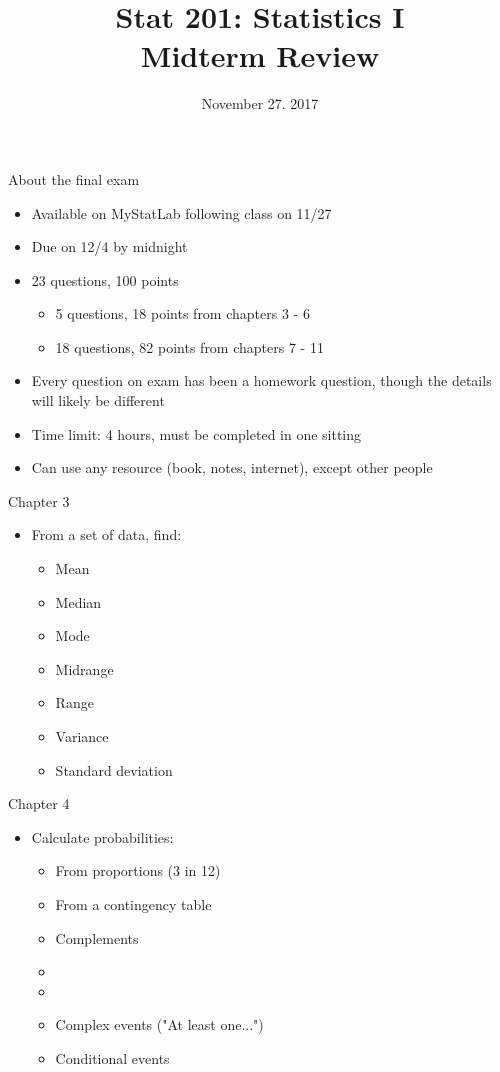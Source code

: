 \documentclass[xcolor=table]{beamer}
\title[Midterm Review]{Stat 201: Statistics I\\Midterm Review}
\author[M. Shyne]{}
\institute[Metro State]{\texttt{[image: ../images/metro\_logo]}}
\date[Nov 27. 2017]{November 27. 2017}
\begin{document}
\frame{\titlepage}

\begin{frame}{About the final exam}
\begin{block}{}
\large
\begin{itemize}
\item Available on MyStatLab following class on 11/27
\item Due on 12/4 by midnight
\item 23 questions, 100 points
\begin{itemize}
\item 5 questions, 18 points from chapters 3 - 6
\item 18 questions, 82 points from chapters 7 - 11
\end{itemize}
\item Every question on exam has been a homework question, though the details will likely be different
\item Time limit: 4 hours, must be completed in one sitting
\item Can use any resource (book, notes, internet), except other people
\end{itemize}
\end{block}
\end{frame}


\begin{frame}{Chapter 3}
\begin{block}{}
\large
\begin{itemize}
\item From a set of data, find:
\begin{itemize}
\item Mean
\item Median
\item Mode
\item Midrange
\item Range
\item Variance
\item Standard deviation
\end{itemize}
\end{itemize}
\end{block}
\end{frame}

\begin{frame}{Chapter 4}
\begin{block}{}
\large
\begin{itemize}
\item Calculate probabilities:
\begin{itemize}
\item From proportions (3 in 12)
\item From a contingency table
\item Complements
\item {}
\item {}
\item Complex events ("At least one...")
\item Conditional events
\end{itemize}
\end{itemize}
\end{block}
\end{frame}
\end{document}
